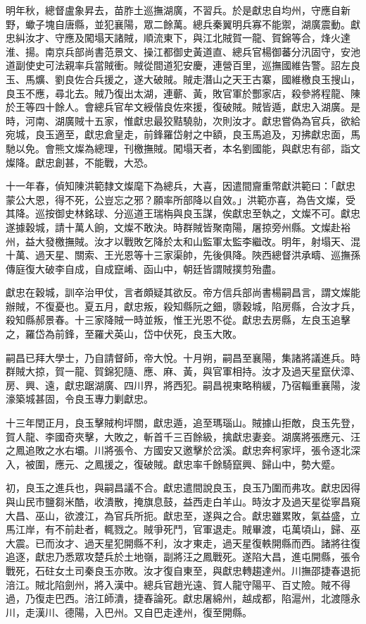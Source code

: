 \begin{pinyinscope}
明年秋，總督盧象昇去，苗胙土巡撫湖廣，不習兵。於是獻忠自均州，守應自新野，蠍子塊自唐縣，並犯襄陽，眾二餘萬。總兵秦翼明兵寡不能禦，湖廣震動。獻忠糾汝才、守應及闖塌天諸賊，順流東下，與江北賊賀一龍、賀錦等合，烽火達淮、揚。南京兵部尚書范景文、操江都御史黃道直、總兵官楊御蕃分汛固守，安池道副使史可法親率兵當賊衝。賊從間道犯安慶，連營百里，巡撫國維告警。詔左良玉、馬爌、劉良佐合兵援之，遂大破賊。賊走潛山之天王古寨，國維檄良玉搜山，良玉不應，尋北去。賊乃復出太湖，連蘄、黃，敗官軍於酆家店，殺參將程龍、陳於王等四十餘人。會總兵官牟文綬偕良佐來援，復破賊。賊皆遁，獻忠入湖廣。是時，河南、湖廣賊十五家，惟獻忠最狡黠驍勍，次則汝才。獻忠嘗偽為官兵，欲給宛城，良玉適至，獻忠倉皇走，前鋒羅岱射之中額，良玉馬追及，刃拂獻忠面，馬馳以免。會熊文燦為總理，刊檄撫賊。闖塌天者，本名劉國能，與獻忠有郤，詣文燦降。獻忠創甚，不能戰，大恐。

十一年春，偵知陳洪範隸文燦麾下為總兵，大喜，因遣間齎重幣獻洪範曰：「獻忠蒙公大恩，得不死，公豈忘之邪？願率所部降以自效。」洪範亦喜，為告文燦，受其降。巡按御史林銘球、分巡道王瑞栴與良玉謀，俟獻忠至執之，文燦不可。獻忠遂據穀城，請十萬人餉，文燦不敢決。時群賊皆聚南陽，屠掠旁州縣。文燦赴裕州，益大發檄撫賊。汝才以戰敗乞降於太和山監軍太監李繼改。明年，射塌天、混十萬、過天星、關索、王光恩等十三家渠帥，先後俱降。陜西總督洪承疇、巡撫孫傳庭復大破李自成，自成竄崤、函山中，朝廷皆謂賊撲剪殆盡。

獻忠在穀城，訓卒治甲仗，言者頗疑其欲反。帝方信兵部尚書楊嗣昌言，謂文燦能辦賊，不復憂也。夏五月，獻忠叛，殺知縣阮之鈿，隳穀城，陷房縣，合汝才兵，殺知縣郝景春。十三家降賊一時並叛，惟王光恩不從。獻忠去房縣，左良玉追擊之，羅岱為前鋒，至羅犬英山，岱中伏死，良玉大敗。

嗣昌已拜大學士，乃自請督師，帝大悅。十月朔，嗣昌至襄陽，集諸將議進兵。時群賊大掠，賀一龍、賀錦犯隨、應、麻、黃，與官軍相持。汝才及過天星竄伏漳、房、興、遠，獻忠踞湖廣、四川界，將西犯。嗣昌視東略稍緩，乃宿輜重襄陽，浚濠築城甚固，令良玉專力剿獻忠。

十三年閏正月，良玉擊賊枸坪關，獻忠遁，追至瑪瑙山。賊據山拒敵，良玉先登，賀人龍、李國奇夾擊，大敗之，斬首千三百餘級，擒獻忠妻妾。湖廣將張應元、汪之鳳追敗之水右壩。川將張令、方國安又邀擊於岔溪。獻忠奔柯家坪，張令逐北深入，被圍，應元、之鳳援之，復破賊。獻忠率千餘騎竄興、歸山中，勢大蹙。

初，良玉之進兵也，與嗣昌議不合。獻忠遣間說良玉，良玉乃圍而弗攻。獻忠因得與山民市鹽芻米酷，收潰散，掩旗息鼓，益西走白羊山。時汝才及過天星從寧昌窺大昌、巫山，欲渡江，為官兵所扼。獻忠至，遂與之合。獻忠雖累敗，氣益盛，立馬江岸，有不前赴者，輒戮之。賊爭死鬥，官軍退走。賊畢渡，屯萬頃山，歸、巫大震。已而汝才、過天星犯開縣不利，汝才東走，過天星復軼開縣而西。諸將往復追逐，獻忠乃悉眾攻楚兵於土地嶺，副將汪之鳳戰死。遂陷大昌，進屯開縣，張令戰死，石砫女土司秦良玉亦敗。汝才復自東至，與獻忠轉趨達州。川撫邵捷春退扼涪江。賊北陷劍州，將入漢中。總兵官趙光遠、賀人龍守陽平、百丈險。賊不得過，乃復走巴西。涪江師潰，捷春論死。獻忠屠綿州，越成都，陷滬州，北渡隱永川，走漢川、德陽，入巴州。又自巴走達州，復至開縣。


\end{pinyinscope}
